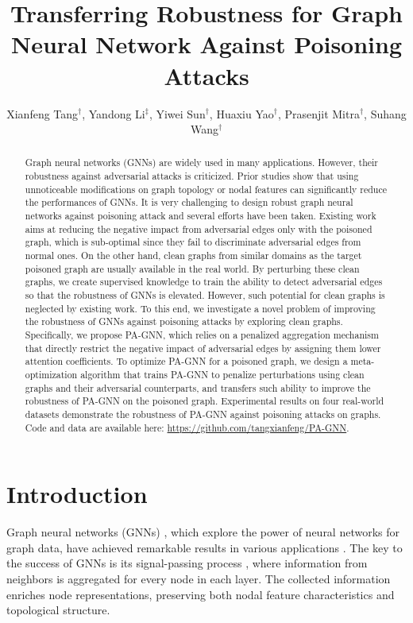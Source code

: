 \documentclass[sigconf]{acmart}
\title{Transferring Robustness for Graph Neural Network Against Poisoning Attacks}
\author{Xianfeng Tang$^\dagger$, Yandong Li$^{\ddagger}$, Yiwei Sun$^\dagger$, Huaxiu Yao$^\dagger$, Prasenjit Mitra$^\dagger$, Suhang Wang$^\dagger$}\authornote{Corresponding Author.}
\affiliation{
\institution{Pennsylvania State University$^\dagger$, University of Central Florida$^\ddagger$}
}
\affiliation{
  \institution{\{tangxianfeng, lyndon.leeseu\}@outlook.com  \{yus162, huy144, pum10, szw494\}@psu.edu}
}
\newcommand{\our}{{PA-GNN}\xspace}
\newcommand{\ours}{{PA-GNN}\xspace}
\begin{document}
\fancyhead{}
\begin{abstract}
Graph neural networks (GNNs) are widely used in many applications. 
However, their robustness against adversarial attacks is criticized. 
Prior studies show that using unnoticeable modifications on graph topology or nodal features can significantly reduce the performances of GNNs.
It is very challenging to design robust graph neural networks against poisoning attack and several efforts have been taken. 
Existing work aims at reducing the negative impact from adversarial edges only with the poisoned graph, which is sub-optimal since they fail to discriminate adversarial edges  from normal ones.
On the other hand, clean graphs from similar domains as the target poisoned graph are usually available in the real world. 
By perturbing these clean graphs, we create supervised knowledge to train the ability to detect adversarial edges so that the robustness of GNNs is elevated.
However, such potential for clean graphs is neglected by existing work.
To this end, we investigate a novel problem of improving the robustness of GNNs against poisoning attacks by exploring clean graphs.
Specifically, we propose \ours, which relies on a penalized aggregation mechanism that directly restrict the negative impact of adversarial edges by assigning them lower attention coefficients.
To optimize \ours for a poisoned graph, we design a meta-optimization algorithm that trains \ours to penalize perturbations using clean graphs and their adversarial counterparts, and transfers such ability to improve the robustness of \ours on the poisoned graph.
Experimental results on four real-world datasets demonstrate the robustness of \our against poisoning attacks on graphs.
Code and data are available here: \textcolor{blue}{\url{https://github.com/tangxianfeng/PA-GNN}}.
\end{abstract} 





\maketitle

\section{Introduction}
Graph neural networks (GNNs) \cite{kipf2016semi, hamilton2017inductive}, which explore the power of neural networks for graph data, have achieved remarkable results in various applications \cite{velivckovic2017graph,fan2019graph,huang2019online}.
The key to the success of GNNs is its signal-passing process \cite{wu2019simplifying}, where information from neighbors is aggregated for every node in each layer. The collected information enriches node representations, preserving both nodal feature characteristics and topological structure.
\end{document}
